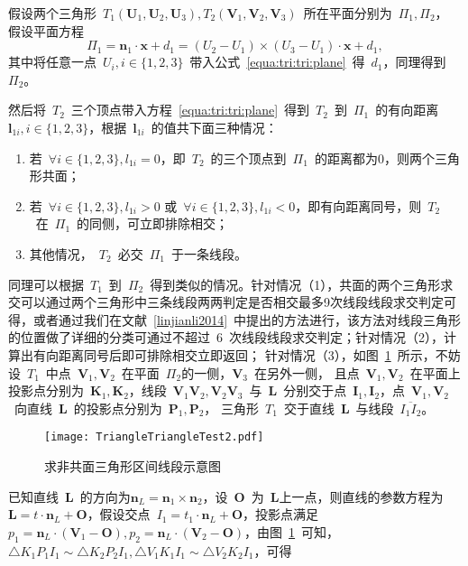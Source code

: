 假设两个三角形~$T_1(\bm{U}_1,\bm{U}_2,\bm{U}_3), T_2(\bm{V}_1,\bm{V}_2,\bm{V}_3)$~所在平面分别为~$\Pi_1, \Pi_2$，
假设平面方程~
\begin{equation}
\Pi_1 = \bm{n}_1 \cdot \bm{x}+d_1 = (U_2 - U_1) \times (U_3-U_1)  \cdot \bm{x} + d_1,
\label{equa:tri:tri:plane}
\end{equation}
其中将任意一点~$U_i, i \in \{1,2,3\}$~带入公式~\ref{equa:tri:tri:plane}~得~$d_1$，同理得到~$\Pi_2$。

然后将~$T_2$~三个顶点带入方程~\ref{equa:tri:tri:plane}~得到~$T_2$~到~$\Pi_1$~的有向距离~$\bm{l}_{1i}, i \in \{1,2,3\}$，根据~$\bm{l}_{1i}$~的值共下面三种情况：
\begin{enumerate}[(1)]
  \item 若~$\forall i \in \{1,2,3\}, l_{1i} = 0$，即~$T_2$~的三个顶点到~$\Pi_1$~的距离都为0，则两个三角形共面；
  \item 若~$\forall i \in \{1,2,3\}, l_{1i} > 0$ 或~$\forall i \in \{1,2,3\}, l_{1i} < 0$，即有向距离同号，则~$T_2$~在~$\Pi_1$~的同侧，可立即排除相交；
  \item 其他情况，~$T_2$~必交~$\Pi_1$~于一条线段。
\end{enumerate}

同理可以根据~$T_1$~到~$\Pi_2$~得到类似的情况。针对情况（1），共面的两个三角形求交可以通过两个三角形中三条线段两两判定是否相交最多9次线段线段求交判定可得，或者通过我们在文献~\ref{linjianli2014}~中提出的方法进行，该方法对线段三角形的位置做了详细的分类可通过不超过~6~次线段线段求交判定；针对情况（2），计算出有向距离同号后即可排除相交立即返回；
针对情况（3），如图~\ref{fig:two:triangle:ui2}~所示，不妨设~$T_1$~中点~$\bm{V}_1, \bm{V}_2$~在平面~$\Pi_2$的一侧，$\bm{V}_3$~在另外一侧，
且点~$\bm{V}_1, \bm{V}_2$~在平面上投影点分别为~$\bm{K}_1,\bm{K}_2$，线段~$\bm{V}_1\bm{V}_2, \bm{V}_2\bm{V}_3$~与~$\bm{L}$~分别交于点~$\bm{I}_1,\bm{I}_2$，点~$\bm{V}_1,\bm{V}_2$~向直线~$\bm{L}$~的投影点分别为~$\bm{P}_1,\bm{P}_2$，
三角形~$T_1$~交于直线~$\bm{L}$~与线段~$\overline{I_1I_2}$。%

\begin{figure}[htbp]
  \centering
    \texttt{[image: TriangleTriangleTest2.pdf]}
    \caption{求非共面三角形区间线段示意图\cite{Moller1997}}
  \label{fig:two:triangle:ui2}
\end{figure}

已知直线~$\bm{L}$~的方向为$\bm{n}_L = \bm{n}_1 \times \bm{n}_2$，设~$\bm{O}$~为~$\bm{L}$上一点，则直线的参数方程为
$\bm{L} = t \cdot \bm{n}_L + \bm{O}$，假设交点~$I_1 = t_1 \cdot \bm{n}_L + \bm{O}$，投影点满足
$p_1 = \bm{n}_L \cdot(\bm{V}_1 - \bm{O}), p_2 = \bm{n}_L \cdot (\bm{V}_2 - \bm{O})$，由图~\ref{fig:two:triangle:ui2}~可知，
$\bigtriangleup K_1P_1I_1 \sim \bigtriangleup K_2P_2I_1, \bigtriangleup V_1K_1I_1 \sim \bigtriangleup V_2K_2I_1$，可得

